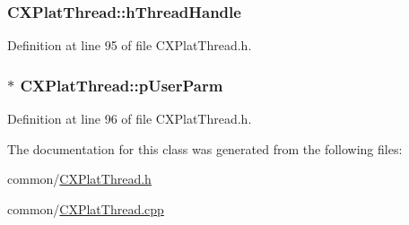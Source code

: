 \hypertarget{class_c_x_plat_thread_af20b7c1d6babaa0ecb429d3e6d846cc4}{
\subsubsection[{h\-Thread\-Handle}]{ {\bf \-C\-X\-Plat\-Thread\-::h\-Thread\-Handle}}}\label{class_c_x_plat_thread_af20b7c1d6babaa0ecb429d3e6d846cc4}


\-Definition at line 95 of file \-C\-X\-Plat\-Thread.\-h.

\hypertarget{class_c_x_plat_thread_a836a233113a162ba4628478b1e230dcf}{
\subsubsection[{p\-User\-Parm}]{$\ast$ {\bf \-C\-X\-Plat\-Thread\-::p\-User\-Parm}}}\label{class_c_x_plat_thread_a836a233113a162ba4628478b1e230dcf}


\-Definition at line 96 of file \-C\-X\-Plat\-Thread.\-h.



\-The documentation for this class was generated from the following files\-:\begin{DoxyCompactItemize}
\item 
common/\hyperlink{_c_x_plat_thread_8h}{\-C\-X\-Plat\-Thread.\-h}\item 
common/\hyperlink{_c_x_plat_thread_8cpp}{\-C\-X\-Plat\-Thread.\-cpp}\end{DoxyCompactItemize}
